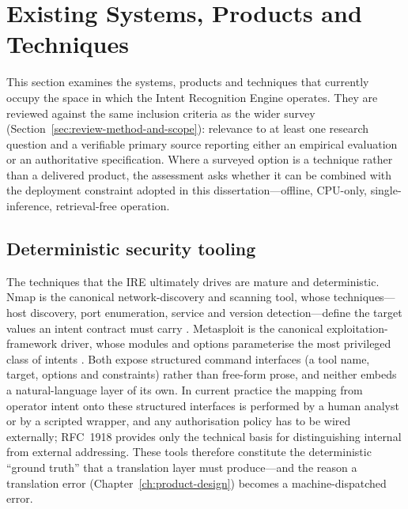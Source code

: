 
\section{Existing Systems, Products and Techniques}\label{sec:existing-systems}

This section examines the systems, products and techniques that currently occupy
the space in which the Intent Recognition Engine operates. They are reviewed
against the same inclusion criteria as the wider survey (Section~\ref{sec:review-method-and-scope}): relevance to at
least one research question and a verifiable primary source reporting either an
empirical evaluation or an authoritative specification. Where a surveyed option
is a technique rather than a delivered product, the assessment asks whether it
can be combined with the deployment constraint adopted in this
dissertation---offline, CPU-only, single-inference, retrieval-free operation.

\subsection*{Deterministic security tooling}

The techniques that the IRE ultimately drives are mature and deterministic. Nmap
is the canonical network-discovery and scanning tool, whose techniques---host
discovery, port enumeration, service and version detection---define the target
values an intent contract must carry \parencite{lyon2009nmap}. Metasploit is the
canonical exploitation-framework driver, whose modules and options parameterise
the most privileged class of intents \parencite{metasploit}. Both expose
structured command interfaces (a tool name, target, options and constraints)
rather than free-form prose, and neither embeds a natural-language layer of its
own. In current practice the mapping from operator intent onto these structured
interfaces is performed by a human analyst or by a scripted wrapper, and any
authorisation policy has to be wired externally; RFC~1918 \parencite{rfc1918}
provides only the technical basis for distinguishing internal from external
addressing. These tools therefore constitute the deterministic ``ground truth''
that a translation layer must produce---and the reason a translation error
(Chapter~\ref{ch:product-design}) becomes a machine-dispatched error.

